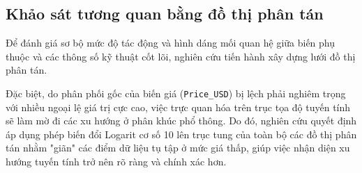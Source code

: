 \documentclass[12pt, a4paper]{article}
\begin{document}
\subsection{Khảo sát tương quan bằng đồ thị phân tán}

Để đánh giá sơ bộ mức độ tác động và hình dáng mối quan hệ giữa biến phụ thuộc và các thông số kỹ thuật cốt lõi, nghiên cứu tiến hành xây dựng lưới đồ thị phân tán. 

Đặc biệt, do phân phối gốc của biến giá (\texttt{Price\_USD}) bị lệch phải nghiêm trọng với nhiều ngoại lệ giá trị cực cao, việc trực quan hóa trên trục tọa độ tuyến tính sẽ làm mờ đi các xu hướng ở phân khúc phổ thông. Do đó, nghiên cứu quyết định áp dụng phép biến đổi Logarit cơ số 10 lên trục tung của toàn bộ các đồ thị phân tán nhằm "giãn" các điểm dữ liệu tụ tập ở mức giá thấp, giúp việc nhận diện xu hướng tuyến tính trở nên rõ ràng và chính xác hơn.
\end{document}
